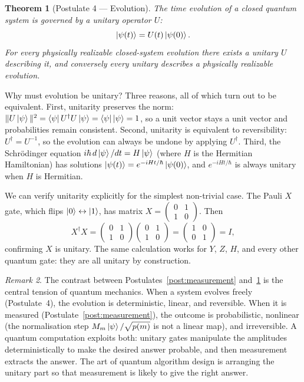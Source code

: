\documentclass[12pt, a4paper, oneside]{report}
\theoremstyle{plain}
\newtheorem{theorem}{Theorem}[chapter]
\theoremstyle{definition}
\theoremstyle{remark}
\newtheorem{remark}[theorem]{Remark}
\begin{document}
\begin{theorem}[Postulate 4 --- Evolution]
\label{post:evolution}
The time evolution of a closed quantum system is governed by a unitary operator $U$:
\[
  \ket{\psi(t)} = U(t)\ket{\psi(0)}.
\]
For every physically realizable closed-system evolution there exists a unitary $U$ describing
it, and conversely every unitary describes a physically realizable evolution.
\end{theorem}

Why must evolution be unitary? Three reasons, all of which turn out to be equivalent.
First, unitarity preserves the norm: $\|U\ket{\psi}\|^2 = \bra{\psi}U^\dagger U\ket{\psi}
= \bra{\psi}\ket{\psi} = 1$, so a unit vector stays a unit vector and probabilities remain
consistent. Second, unitarity is equivalent to reversibility: $U^\dagger = U^{-1}$, so the
evolution can always be undone by applying $U^\dagger$. Third, the Schrödinger equation
$i\hbar\,d\ket{\psi}/dt = H\ket{\psi}$ (where $H$ is the Hermitian Hamiltonian) has
solutions $\ket{\psi(t)} = e^{-iHt/\hbar}\ket{\psi(0)}$, and $e^{-iHt/\hbar}$ is always
unitary when $H$ is Hermitian.

We can verify unitarity explicitly for the simplest non-trivial case. The Pauli $X$ gate,
which flips $\ket{0} \leftrightarrow \ket{1}$, has matrix $X = \begin{pmatrix}0&1\\1&0
\end{pmatrix}$. Then
\[
  X^\dagger X
  = \begin{pmatrix}0&1\\1&0\end{pmatrix}\begin{pmatrix}0&1\\1&0\end{pmatrix}
  = \begin{pmatrix}1&0\\0&1\end{pmatrix} = I,
\]
confirming $X$ is unitary. The same calculation works for $Y$, $Z$, $H$, and every other
quantum gate: they are all unitary by construction.

\begin{remark}
The contrast between Postulates~\ref{post:measurement} and~\ref{post:evolution} is the
central tension of quantum mechanics. When a system evolves freely (Postulate~4), the
evolution is deterministic, linear, and reversible. When it is measured
(Postulate~\ref{post:measurement}), the outcome is probabilistic, nonlinear (the normalisation
step $M_m\ket{\psi}/\sqrt{p(m)}$ is not a linear map), and irreversible. A quantum computation
exploits both: unitary gates manipulate the amplitudes deterministically to make the desired
answer probable, and then measurement extracts the answer. The art of quantum algorithm
design is arranging the unitary part so that measurement is likely to give the right answer.
\end{remark}
\end{document}
